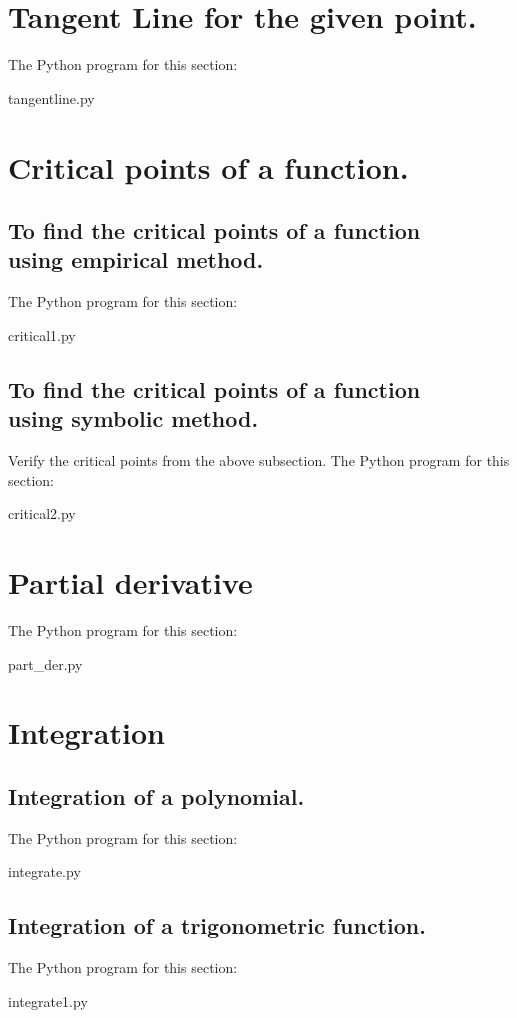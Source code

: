 \documentclass{article}
\begin{document}
\newpage
\section{Tangent Line for the given point.}
The Python program for this section:

{tangentline.py}

\newpage
\section{Critical points of a function.}
\subsection{To find the critical points of a function\\ using empirical method.}
The Python program for this section:

{critical1.py}

\newpage
\subsection{To find the critical points of a function\\ using symbolic method.}
Verify the critical points from the above subsection.
\newline
The Python program for this section:

{critical2.py}

\newpage
\section{Partial derivative }
The Python program for this section:

{part_der.py}

\newpage
\section{Integration}
\subsection{Integration of a polynomial.}
The Python program for this section:

{integrate.py}
\newpage
\subsection{Integration of a trigonometric function.}
The Python program for this section:

{integrate1.py}
\newpage
\end{document}
